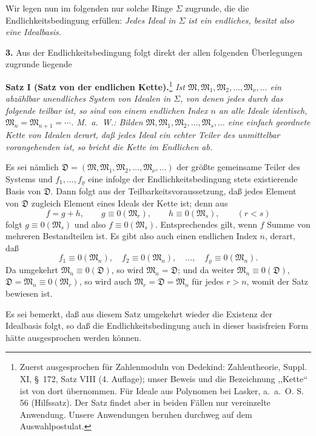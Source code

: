 \documentclass[11pt]{article}
\newcommand{\ideal}[1]{\mathfrak{#1}}
\begin{document}
Wir legen nun im folgenden nur solche Ringe $\Sigma$ zugrunde, die die Endlichkeitsbedingung erfüllen: \emph{Jedes Ideal in $\Sigma$ ist ein endliches, besitzt also eine Idealbasis.}

\textbf{3.} Aus der Endlichkeitsbedingung folgt direkt der allen folgenden Überlegungen zugrunde liegende

\textbf{Satz I (Satz von der endlichen Kette).}\footnote{Zuerst ausgesprochen für Zahlenmoduln von Dedekind: Zahlentheorie, Suppl. XI, \S~172, Satz VIII (4. Auflage); unser Beweis und die Bezeichnung ,,Kette`` ist von dort übernommen. Für Ideale aus Polynomen bei Lasker, a.~a.~O. S. 56 (Hilfssatz). Der Satz findet aber in beiden Fällen nur vereinzelte Anwendung. Unsere Anwendungen beruhen durchweg auf dem Auswahlpostulat.} \emph{Ist $\ideal M,\ideal M_1,\ideal M_2,\ldots,\ideal M_\nu,\ldots$ ein abzählbar unendliches System von Idealen in $\Sigma$, von denen jedes durch das folgende teilbar ist, so sind von einem endlichen Index $n$ an alle Ideale identisch, $\ideal M_n=\ideal M_{n+1}=\cdots$. M.~a.~W.: Bilden $\ideal M,\ideal M_1,\ideal M_2,\ldots,\ideal M_s,\ldots$ eine einfach geordnete Kette von Idealen derart, daß jedes Ideal ein echter Teiler des unmittelbar vorangehenden ist, so bricht die Kette im Endlichen ab.}

Es sei nämlich $\ideal D=(\ideal M,\ideal M_1,\ideal M_2,\ldots,\ideal M_\nu,\ldots)$ der größte gemeinsame Teiler des Systems und $f_1,\ldots,f_\varrho$ eine infolge der Endlichkeitsbedingung stets existierende Basis von $\ideal D$. Dann folgt aus der Teilbarkeitsvoraussetzung, daß jedes Element von $\ideal D$ zugleich Element eines Ideals der Kette ist; denn aus
\[
 f=g+h,\qquad g\equiv0(\ideal M_r),\qquad h\equiv0(\ideal M_s),\qquad (r<s)
\]
folgt $g\equiv0(\ideal M_s)$ und also $f\equiv0(\ideal M_s)$. Entsprechendes gilt, wenn $f$ Summe von mehreren Bestandteilen ist. Es gibt also auch einen endlichen Index $n$, derart, daß
\[
 f_1\equiv0(\ideal M_n),\quad f_2\equiv0(\ideal M_n),\quad\ldots,\quad f_\varrho\equiv0(\ideal M_n).
\]
Da umgekehrt $\ideal M_n\equiv0(\ideal D)$, so wird $\ideal M_n=\ideal D$; und da weiter $\ideal M_n\equiv0(\ideal D)$, $\ideal D=\ideal M_n\equiv0(\ideal M_r)$, so wird auch $\ideal M_r=\ideal D=\ideal M_n$ für jedes $r>n$, womit der Satz bewiesen ist.

Es sei bemerkt, daß aus diesem Satz umgekehrt wieder die Existenz der Idealbasis folgt, so daß die Endlichkeitsbedingung auch in dieser basisfreien Form hätte ausgesprochen werden können.
\end{document}
